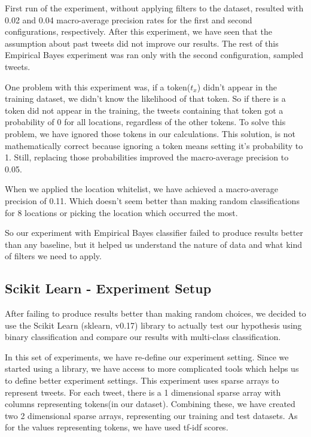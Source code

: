 \documentclass[twoside,11pt]{article}
\begin{document}
First run of the experiment, without applying filters to the dataset, resulted with 0.02 and 0.04 macro-average precision rates for the first and second configurations, respectively. After this experiment, we have seen that the assumption about past tweets did not improve our results. The rest of this Empirical Bayes experiment was ran only with the second configuration, sampled tweets.

One problem with this experiment was, if a token($t_x$) didn't appear in the training dataset, we didn't know the likelihood of that token. So if there is a token did not appear in the training, the tweets containing that token got a probability of 0 for all locations, regardless of the other tokens. To solve this problem, we have ignored those tokens in our calculations. This solution, is not mathematically correct because ignoring a token means setting it's probability to 1. Still, replacing those probabilities improved the macro-average precision to 0.05.

When we applied the location whitelist, we have achieved a macro-average precision of 0.11. Which doesn't seem better than making random classifications for 8 locations or picking the location which occurred the most. 

So our experiment with Empirical Bayes classifier failed to produce results better than any baseline, but it helped us understand the nature of data and what kind of filters we need to apply.

\subsection{Scikit Learn - Experiment Setup}
After failing to produce results better than making random choices, we decided to use the Scikit Learn \cite{scikit-learn}(sklearn, v0.17) library to actually test our hypothesis using binary classification and compare our results with multi-class classification.

In this set of experiments, we have re-define our experiment setting. Since we started using a library, we have access to more complicated tools which helps us to define better experiment settings. This experiment uses sparse arrays to represent tweets. For each tweet, there is a 1 dimensional sparse array with columns representing tokens(in our dataset). Combining these, we have created two 2 dimensional sparse arrays, representing our training and test datasets. As for the values representing tokens, we have used tf-idf scores. 
\end{document}
